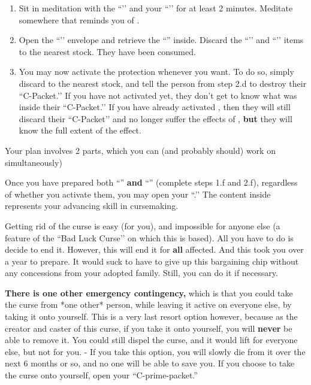 \documentclass[green]{GL2020}
\begin{document}
\begin{enumerate}
\begin{enumerate}
    \item Sit in meditation with the ``\iSlowActingPoisonCure{}’’ and your ``\iWIPProtection{}’’ for at least 2 minutes. Meditate somewhere that reminds you of \cFarmGod{}.
    \item Open the ``\iWIPProtection{}’’ envelope and retrieve the ``\iProtection{}'' inside. Discard the ``\iSlowActingPoisonCure{}’’ and ``\iWIPProtection{}’’ items to the nearest stock. They have been consumed.
    \item  You may now activate the protection whenever you want. To do so, simply discard \iProtection{} to the nearest stock, and tell the person from step 2.d to destroy their ``C-Packet.’’ If you have not activated \iWithering{} yet, they don’t get to know what was inside their ``C-Packet.’’ If you have already activated \iWithering{}, then they will still discard their ``C-Packet’’ and no longer suffer the effects of \iWithering{}, \textbf{but} they will know the full extent of the effect.
  \end{enumerate}
\end{enumerate}

Your plan involves 2 parts, which you can (and probably should) work on simultaneously)

Once you have prepared both ``\iWithering{}'' \textbf{and} ``\iProtection{}'' (complete steps 1.f and 2.f), regardless of whether you activate them, you may open your ``\mPacketThree{}.’’ The content inside represents your advancing skill in cursemaking.

Getting rid of the curse is easy (for you), and impossible for anyone else (a feature of the ``Bad Luck Curse’’ on which this is based). All you have to do is decide to end it. However, this will end it for \textbf{all} affected. And this took you over a year to prepare. It would suck to have to give up this bargaining chip without any concessions from your adopted family. Still, you can do it if necessary.

\textbf{There is one other emergency contingency,} which is that you could take the curse from *one other* person, while leaving it active on everyone else, by taking it onto yourself. This is a very last resort option however, because as the creator and caster of this curse, if you take it onto yourself, you will \textbf{never} be able to remove it. You could still dispel the curse, and it would lift for everyone else, but not for you. - If you take this option, you will slowly die from it over the next 6 months or so, and no one will be able to save you. If you choose to take the curse onto yourself, open your ``C-prime-packet.''
\end{document}
